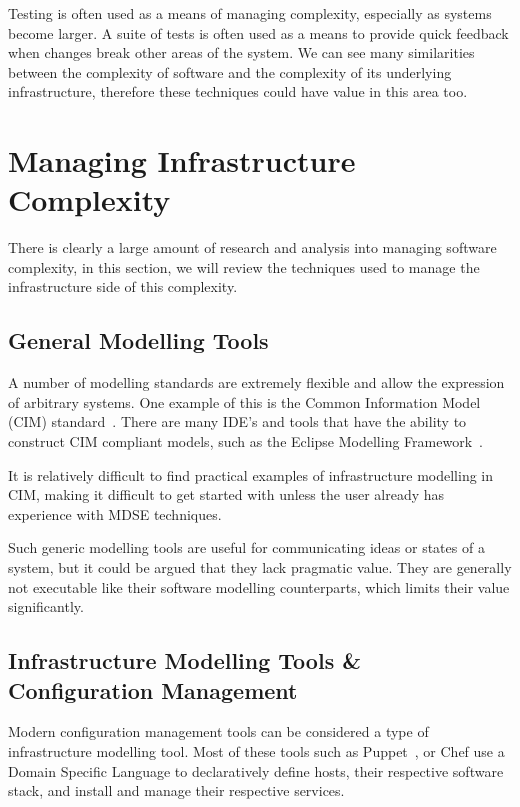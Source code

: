 \documentclass{cshonours}
\begin{document}
Testing is often used as a means of managing complexity, especially as systems become larger. A suite of tests is often used as a means to provide quick feedback when changes break other areas of the system. We can see many similarities between the complexity of software and the complexity of its underlying infrastructure, therefore these techniques could have value in this area too.

\pagebreak
\section{Managing Infrastructure Complexity}

There is clearly a large amount of research and analysis into managing software complexity, in this section, we will review the techniques used to manage the infrastructure side of this complexity.

\subsection{General Modelling Tools}

A number of modelling standards are extremely flexible and allow the expression of arbitrary systems. One example of this is the Common Information Model (CIM) standard~\cite{CIM}. There are many IDE’s and tools that have the ability to construct CIM compliant models, such as the Eclipse Modelling Framework~\cite{EMF}.

It is relatively difficult to find practical examples of infrastructure modelling in CIM, making it difficult to get started with unless the user already has experience with MDSE techniques.

Such generic modelling tools are useful for communicating ideas or states of a system, but it could be argued that they lack pragmatic value. They are generally not  executable like their software modelling counterparts, which limits their value significantly.

\subsection{Infrastructure Modelling Tools \& Configuration Management}

Modern configuration management tools can be considered a type of infrastructure modelling tool. Most of these tools such as Puppet~\cite{Puppet}, or Chef\cite{Chef} use a Domain Specific Language to declaratively define hosts, their respective software stack, and install and manage their respective services.
\end{document}
